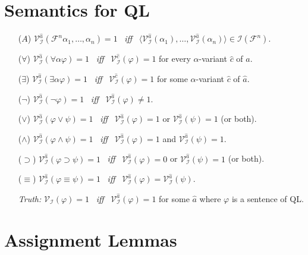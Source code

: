 \documentclass[a4paper, 11pt]{article} %
\newcommand{\tuple}[1]{\langle#1\rangle} %
\newcommand{\I}{\mathcal{I}}
\newcommand{\F}{\mathcal{F}}
\newcommand{\VV}[2]{\mathcal{V}_{#1}^{#2}} %
\begin{document}
\section*{Semantics for QL}

\begin{enumerate}
  \item[($A$)] $\VV{\I}{\hat{a}}(\F^n\alpha_1,\ldots,\alpha_n)=1$ ~\textit{iff}~ $\tuple{\VV{\I}{\hat{a}}{(\alpha_1)},\ldots,\VV{\I}{\hat{a}}{(\alpha_n)}}\in\I(\F^n)$.
  \item[(\hspace{1pt}$\forall$\hspace{1pt})] $\VV{\I}{\hat{a}}(\forall\alpha\varphi)=1$ ~\textit{iff}~ $\VV{\I}{\hat{c}}(\varphi)=1$ for every $\alpha$-variant $\hat{c}$ of $\hat{a}$.
  \item[(\hspace{1pt}$\exists$\hspace{1pt})] $\VV{\I}{\hat{a}}(\exists\alpha\varphi)=1$ ~\textit{iff}~ $\VV{\I}{\hat{c}}(\varphi)=1$ for some $\alpha$-variant $\hat{c}$ of $\hat{a}$.
  \item[($\neg$)] $\VV{\I}{\hat{a}}(\neg\varphi)=1$ ~\textit{iff}~ $\VV{\I}{\hat{a}}(\varphi)\neq 1$.
  \item[($\vee$)] $\VV{\I}{\hat{a}}(\varphi \vee \psi)=1$ ~\textit{iff}~ $\VV{\I}{\hat{a}}(\varphi)=1$ or $\VV{\I}{\hat{a}}(\psi)=1$ (or both).
  \item[($\wedge$)] $\VV{\I}{\hat{a}}(\varphi \wedge \psi)=1$ ~\textit{iff}~ $\VV{\I}{\hat{a}}(\varphi)=1$ and $\VV{\I}{\hat{a}}(\psi)=1$.
  \item[($\supset$)] $\VV{\I}{\hat{a}}(\varphi \supset \psi)=1$ ~\textit{iff}~ $\VV{\I}{\hat{a}}(\varphi)=0$ or $\VV{\I}{\hat{a}}(\psi)=1$ (or both).
  \item[($\equiv$)] $\VV{\I}{\hat{a}}(\varphi \equiv \psi)=1$ ~\textit{iff}~ $\VV{\I}{\hat{a}}(\varphi)=\VV{\I}{\hat{a}}(\psi)$.
    \vspace{.1in}
  \item[\it Truth:] $\VV{\I}{}(\varphi)=1$ ~\textit{iff}~ $\VV{\I}{\hat{a}}(\varphi)=1$ for some $\hat{a}$ where $\varphi$ is a sentence of QL. 
\end{enumerate}






\section*{Assignment Lemmas}
\end{document}
